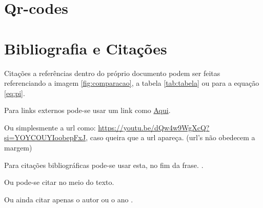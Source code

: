 \documentclass[twoside]{article}
\begin{document}
	
	\section{Qr-codes}
	
	\begin{center}
	\end{center}
	

	\section{Bibliografia e Citações}

	Citações a referências dentro do próprio documento podem ser feitas referenciando a imagem \ref{fig:comparacao}, a tabela \ref{tab:tabela} ou para a equação \eqref{eq:pi}.

	Para links externos pode-se usar um link como \href{https://youtu.be/dQw4w9WgXcQ?si=YOYCOUYIoobepFxJ}{Aqui}.
	
	Ou simplesmente a url como: \url{https://youtu.be/dQw4w9WgXcQ?si=YOYCOUYIoobepFxJ}, caso queira que a url apareça. (url's não obedecem a margem)
	
	Para citações bibliográficas pode-se usar esta, no fim da frase. \cite{latex}.
	
	Ou pode-se citar \textcite{einstein} no meio do texto.
	
	Ou ainda citar apenas o autor \citeauthor{einstein} ou o ano \citeyear{einstein}.
	
	\printbibliography
		
\end{document}
